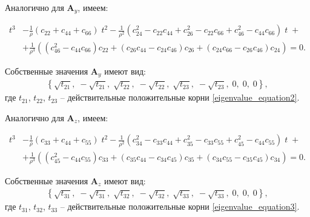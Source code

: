	Аналогично для $\mathbf{A}_y$, имеем:
\begin{small}
\begin{align}	
	\label{eigenvalue_equation2}
	t^{3} &- \frac{1}{\rho}(c_{22} + c_{44} + c_{66})\;t^{2} - \frac{1}{\rho^{2}}(c_{24}^{2} - c_{22}c_{44} + c_{26}^{2} - c_{22}c_{66} + c_{46}^{2} - c_{44}c_{66})\;t\;+ \nonumber\\
	&+ \frac{1}{\rho^{3}}((c_{46}^{2} - c_{44}c_{66})c_{22} + (c_{26}c_{44} - c_{24}c_{46})c_{26} + (c_{24}c_{66} - c_{26}c_{46})c_{24}) = 0.
\end{align}
\end{small}
	Собственные значения $\mathbf{A}_y$ имеют вид:
\begin{align}
	\left\{\sqrt{t_{21}},\;-\sqrt{t_{21}},\;\sqrt{t_{22}},\;-\sqrt{t_{22}},\;\sqrt{t_{23}},\;-\sqrt{t_{23}},\;0,\;0,\;0\right\},
\end{align}
	где $t_{21}$, $t_{22}$, $t_{23}$ -- действительные положительные корни \eqref{eigenvalue_equation2}.
	
	Аналогично для $\mathbf{A}_z$, имеем:
\begin{small}
\begin{align}	
	\label{eigenvalue_equation3}
	t^{3} &- \frac{1}{\rho}(c_{33} + c_{44} + c_{55})\;t^{2} - \frac{1}{\rho^{2}}(c_{34}^{2} - c_{33}c_{44} + c_{35}^{2} - c_{33}c_{55} + c_{45}^{2} - c_{44}c_{55})\;t\;+ \nonumber\\
	&+ \frac{1}{\rho^{3}}((c_{45}^{2} - c_{44}c_{55})c_{33} + (c_{35}c_{44} - c_{34}c_{45})c_{35} + (c_{34}c_{55} - c_{35}c_{45})c_{34}) = 0.
\end{align}
\end{small}
	Собственные значения $\mathbf{A}_z$ имеют вид:
\begin{align}
	\left\{\sqrt{t_{31}},\;-\sqrt{t_{31}},\;\sqrt{t_{32}},\;-\sqrt{t_{32}},\;\sqrt{t_{33}},\;-\sqrt{t_{33}},\;0,\;0,\;0\right\},
\end{align}
	где $t_{31}$, $t_{32}$, $t_{33}$ -- действительные положительные корни \eqref{eigenvalue_equation3}.
	
